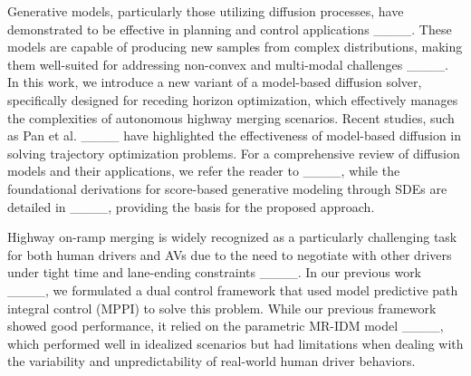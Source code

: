 Generative models, particularly those utilizing diffusion processes, have demonstrated to be effective in planning and control applications ____. 
These models are capable of producing new samples from complex distributions, making them well-suited for addressing non-convex and multi-modal challenges ____. 
In this work, we introduce a new variant of a model-based diffusion solver, specifically designed for receding horizon optimization, which effectively manages the complexities of autonomous highway merging scenarios. 
Recent studies, such as Pan et al. ____ have highlighted the effectiveness of model-based diffusion in solving trajectory optimization problems. 
For a comprehensive review of diffusion models and their applications, we refer the reader to ____, while the foundational derivations for score-based generative modeling through SDEs are detailed in ____, providing the basis for the proposed approach.

Highway on-ramp merging is widely recognized as a particularly challenging task for both human drivers and AVs due to the need to negotiate with other drivers under tight time and lane-ending constraints  ____. 
In our previous work ____, we formulated a dual control framework that used model predictive path integral control (MPPI) to solve this problem. 
While our previous framework showed good performance, it relied on the parametric MR-IDM model ____, which performed well in idealized scenarios but had limitations when dealing with the variability and unpredictability of real-world human driver behaviors.